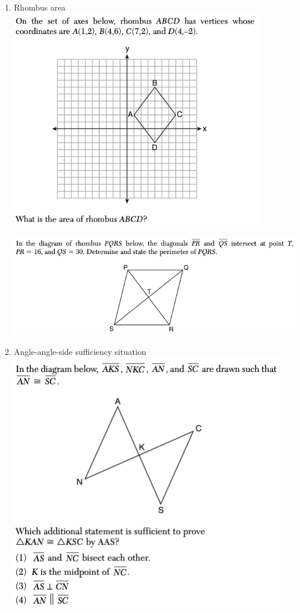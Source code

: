 \documentclass[12pt, oneside]{article}
\begin{document}
\begin{enumerate}
\item Rhombus area\\
\includegraphics[width=11cm]{R-4images/R-4RhombusL.png}

\includegraphics[width=15cm]{R-4images/R-4RhombusN.png}

\newpage
\item Angle-angle-side sufficiency situation\\
\includegraphics[width=12cm]{R-5images/R-5AAS-proof.png}


\end{enumerate}
\end{document}
